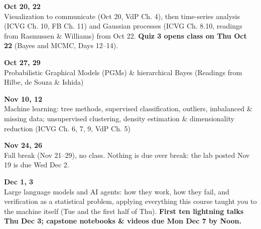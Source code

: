\begin{innerlist}
\item[] \smallskip

\item {\bf\headerfont\color{RoyalBlue} Oct 20, 22}\\ Visualization to communicate (Oct 20, VdP Ch. 4), then time-series analysis (ICVG Ch. 10, FB Ch. 11) and Gaussian processes (ICVG Ch. 8.10, readings from Rasmussen \& Williams) from Oct 22. {\bf Quiz 3 opens class on Thu Oct 22} (Bayes and MCMC, Days 12--14).\smallskip

\item {\bf\headerfont\color{RoyalBlue} Oct 27, 29}\\ Probabilistic Graphical Models (PGMs) \& hierarchical Bayes (Readings from Hilbe, de Souza \& Ishida)\smallskip

\item[] \smallskip

\item {\bf\headerfont\color{RoyalBlue} Nov 10, 12}\\ Machine learning: tree methods, supervised classification, outliers, imbalanced \& missing data; unsupervised clustering, density estimation \& dimensionality reduction (ICVG Ch. 6, 7, 9, VdP Ch. 5)\smallskip

\item[] \smallskip

\item {\bf\headerfont\color{RoyalBlue} Nov 24, 26}\\ {\color{Red} Fall break (Nov 21--29), no class.} Nothing is due over break: the lab posted Nov 19 is due Wed Dec 2.\smallskip

\item {\bf\headerfont\color{RoyalBlue} Dec 1, 3}\\ Large language models and AI agents: how they work, how they fail, and verification as a statistical problem, applying everything this course taught you to the machine itself (Tue and the first half of Thu). {\bf First ten lightning talks Thu Dec 3; capstone notebooks \& videos due Mon Dec 7 by Noon.}\smallskip


\end{innerlist}
